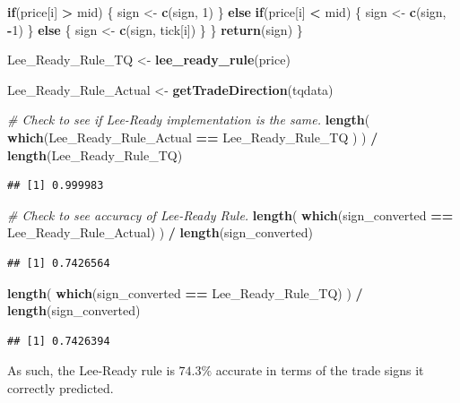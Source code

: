 \documentclass[
]{article}
\newenvironment{Shaded}{\begin{snugshade}}{\end{snugshade}}
\newcommand{\CommentTok}[1]{\textcolor[rgb]{0.56,0.35,0.01}{\textit{#1}}}
\newcommand{\ControlFlowTok}[1]{\textcolor[rgb]{0.13,0.29,0.53}{\textbf{#1}}}
\newcommand{\DecValTok}[1]{\textcolor[rgb]{0.00,0.00,0.81}{#1}}
\newcommand{\FunctionTok}[1]{\textcolor[rgb]{0.13,0.29,0.53}{\textbf{#1}}}
\newcommand{\NormalTok}[1]{#1}
\newcommand{\OtherTok}[1]{\textcolor[rgb]{0.56,0.35,0.01}{#1}}
\newcommand{\SpecialCharTok}[1]{\textcolor[rgb]{0.81,0.36,0.00}{\textbf{#1}}}
\begin{document}
\begin{Shaded}
\begin{Highlighting}[]
        \ControlFlowTok{if}\NormalTok{(price[i] }\SpecialCharTok{\textgreater{}}\NormalTok{ mid)}
\NormalTok{        \{}
\NormalTok{            sign }\OtherTok{\textless{}{-}} \FunctionTok{c}\NormalTok{(sign, }\DecValTok{1}\NormalTok{)}
\NormalTok{        \}}
        \ControlFlowTok{else} \ControlFlowTok{if}\NormalTok{(price[i] }\SpecialCharTok{\textless{}}\NormalTok{ mid)}
\NormalTok{        \{}
\NormalTok{            sign }\OtherTok{\textless{}{-}} \FunctionTok{c}\NormalTok{(sign, }\SpecialCharTok{{-}}\DecValTok{1}\NormalTok{)}
\NormalTok{        \}}
        \ControlFlowTok{else} 
\NormalTok{        \{}
\NormalTok{            sign }\OtherTok{\textless{}{-}} \FunctionTok{c}\NormalTok{(sign, tick[i])}
\NormalTok{        \}}
\NormalTok{    \}}
    \FunctionTok{return}\NormalTok{(sign)}
\NormalTok{\}}

\NormalTok{Lee\_Ready\_Rule\_TQ }\OtherTok{\textless{}{-}} \FunctionTok{lee\_ready\_rule}\NormalTok{(price)}

\NormalTok{Lee\_Ready\_Rule\_Actual }\OtherTok{\textless{}{-}} \FunctionTok{getTradeDirection}\NormalTok{(tqdata)}

\CommentTok{\# Check to see if Lee{-}Ready implementation is the same.}
\FunctionTok{length}\NormalTok{( }\FunctionTok{which}\NormalTok{(Lee\_Ready\_Rule\_Actual }\SpecialCharTok{==}\NormalTok{ Lee\_Ready\_Rule\_TQ ) ) }\SpecialCharTok{/} \FunctionTok{length}\NormalTok{(Lee\_Ready\_Rule\_TQ)}
\end{Highlighting}
\end{Shaded}

\begin{verbatim}
## [1] 0.999983
\end{verbatim}

\begin{Shaded}
\begin{Highlighting}[]
\CommentTok{\# Check to see accuracy of Lee{-}Ready Rule.}
\FunctionTok{length}\NormalTok{( }\FunctionTok{which}\NormalTok{(sign\_converted }\SpecialCharTok{==}\NormalTok{  Lee\_Ready\_Rule\_Actual) ) }\SpecialCharTok{/} \FunctionTok{length}\NormalTok{(sign\_converted)}
\end{Highlighting}
\end{Shaded}

\begin{verbatim}
## [1] 0.7426564
\end{verbatim}

\begin{Shaded}
\begin{Highlighting}[]
\FunctionTok{length}\NormalTok{( }\FunctionTok{which}\NormalTok{(sign\_converted }\SpecialCharTok{==}\NormalTok{  Lee\_Ready\_Rule\_TQ) ) }\SpecialCharTok{/} \FunctionTok{length}\NormalTok{(sign\_converted)}
\end{Highlighting}
\end{Shaded}

\begin{verbatim}
## [1] 0.7426394
\end{verbatim}

As such, the Lee-Ready rule is \(74.3\%\) accurate in terms of the trade
signs it correctly predicted.
\end{document}
